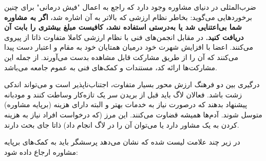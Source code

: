 ضرب‌المثلی در دنیای مشاوره وجود دارد که راجع به اعمال "فیش درمانی"
برای چنین برخورد‌هایی می‌گوید: بخاطر نظام ارزشی که بالاتر به آن اشاره شد،
{\bfseries
اگر به مشاوره شما بی‌اعتنایی شد یا به‌درستی استفاده نشد، کافیست
مبلغ بیشتری را بابت آن دریافت کنید.
}
در مقابل انجمن‌های فنی با نظام ارزشی کاملا متفاوت
ذاتا از
پیروی می‌کنند.
اعضا با افزایش شهرت خود درمیان همتایان خود به مقام و اعتبار
دست پیدا می‌کنند که آن را از طریق مشارکت قابل مشاهده بدست می‌آورند.
از جمله این مشارکت‌ها ارائه کد، مستندات و کمک‌های فنی به عموم جامعه می‌باشد.

درگیری بین دو فرهنگ ارزش محور بسیار متفاوت، اجتناب‌ناپذیر است
و می‌تواند اندکی زشت باشد.
فعالان لاگ باید قبل از بریدن سر یک تازه‌کار وساطت کنند
و مودبانه پیشنهاد بدهند که درصورت نیاز به خدمات بهتر
و البته دارای هزینه (برپایه مشاوره) متوسل شوند.
آدم‌ها همیشه قضاوت می‌کنند. این مرز (که درخواست افراد
نیاز به هزینه کردن به یک مشاور دارد یا می‌توان آن را در
لاگ انجام داد) ذاتا جای بحث دارند.

در زیر چند علامت لیست شده که نشان می‌دهد پرسشگر باید به
کمک‌های برپایه مشاوره ارجاع داده شود:

